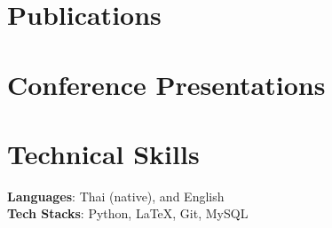 \documentclass[letterpaper,11pt]{article}
\begin{document}
	
	\section{Publications}
	\nocite{*}
	{%
		\justifying
		\printbibliography[heading=none, env=resumeitembib, notkeyword=conference]
	}


	\section{Conference Presentations}
	\nocite{*}
	{%
		\justifying
		\printbibliography[heading=none, env=resumeitembib, keyword=conference]
	}
	
	
	\section{Technical Skills}
	\begin{itemize}[leftmargin=0.15in, label={}]
		\small{\item{
			\textbf{Languages}{: Thai (native), and English} \\
			\textbf{Tech Stacks}{: Python, LaTeX, Git, MySQL}
		}}
	\end{itemize}
	
\end{document}

